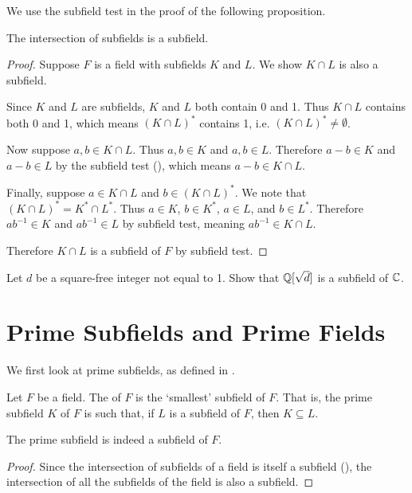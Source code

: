 We use the subfield test in the proof of the following proposition.
\begin{proposition}\label{prop-intersection-of-subfields-is-subfield}
    The intersection of subfields is a subfield.
\end{proposition}
\begin{proof}
    Suppose $F$ is a field with subfields $K$ and $L$. We show $K \cap L$ is also a subfield.

    Since $K$ and $L$ are subfields, $K$ and $L$ both contain 0 and 1. Thus $K \cap L$ contains both 0 and 1, which means $(K \cap L)^\ast$ contains 1, i.e. $(K\cap L)^\ast \neq \emptyset$.

    Now suppose $a, b \in K \cap L$. Thus $a, b \in K$ and $a, b \in L$. Therefore $a - b \in K$ and $a - b \in L$ by the subfield test (), which means $a - b \in K \cap L$.

    Finally, suppose $a \in K \cap L$ and $b \in (K \cap L)^\ast$. We note that $(K \cap L)^\ast = K^\ast \cap L^\ast$. Thus $a \in K$, $b \in K^\ast$, $a \in L$, and $b \in L^\ast$. Therefore $ab^{-1} \in K$ and $ab^{-1} \in L$ by subfield test, meaning $ab^{-1} \in K \cap L$.

    Therefore $K \cap L$ is a subfield of $F$ by subfield test.
\end{proof}

\begin{exercise}
    Let $d$ be a square-free integer not equal to 1. Show that $\mathbb{Q}[\sqrt{d}]$ is a subfield of $\mathbb{C}$.
\end{exercise}

\section{Prime Subfields and Prime Fields}
We first look at prime subfields, as defined in \cite[p.~268]{gallian_2016}.

\begin{definition}\label{definition-prime-subfield}
    Let $F$ be a field. The  of $F$ is the `smallest' subfield of $F$. That is, the prime subfield $K$ of $F$ is such that, if $L$ is a subfield of $F$, then $K \subseteq L$.
\end{definition}
\begin{proposition}
    The prime subfield is indeed a subfield of $F$.
\end{proposition}
\begin{proof}
    Since the intersection of subfields of a field is itself a subfield (), the intersection of all the subfields of the field is also a subfield.
\end{proof}

